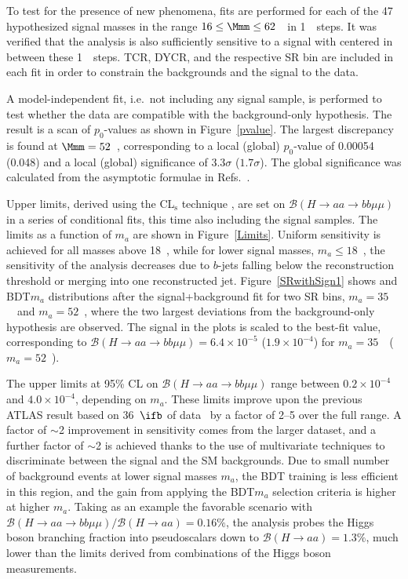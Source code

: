 \documentclass[cernpreprint, backref=false, texlive=2020, UKenglish, dvipsnames, block=none, texmf]{atlasdoc}
\begin{document}
 
To test for the presence of new phenomena, fits are performed for each of the 47 hypothesized signal masses in the range $16\leq\Mmm\leq62$~\GeV\ in 1~\GeV\ steps.
It was verified that the analysis is also sufficiently sensitive to a signal with \Mmm centered in between these 1~\GeV\ steps.
TCR, DYCR, and the respective SR bin are included in each fit in order to constrain  the backgrounds and the signal to the data.
 
 
A model-independent fit, i.e.\ not including any signal sample, is performed to test whether the data are compatible with the background-only hypothesis. The result  is a scan of $p_0$-values as shown in Figure~\ref{pvalue}. The largest discrepancy is found at $\Mmm=52$~\GeV, corresponding to a local (global) $p_0$-value of 0.00054 (0.048) and a local (global) significance of $3.3 \sigma$ ($1.7 \sigma$). The global significance was calculated from the asymptotic formulae in Refs.~\cite{Cowan:2010js,Gross_2010}.
 
 
Upper limits, derived using  the CL$_\text{s}$ technique \cite{Read:2002hq,Junk:1999kv}, are set on $\mathcal{B}(H \rightarrow aa \rightarrow bb\mu\mu)$ in a series of conditional fits, this time also including the signal samples.
The limits as a function of $m_a$ are shown in Figure~\ref{Limits}.
Uniform sensitivity is achieved for all masses above 18~\GeV, while for lower signal masses, $m_a \leq 18$~\GeV, the sensitivity of the analysis decreases due to $b$-jets falling below the reconstruction threshold or merging into one reconstructed jet.
Figure~\ref{SRwithSign1} shows \Mmm and BDT$m_a$ distributions  after the signal+background fit for two SR bins, $m_a=35$~\GeV\ and $m_a=52$~\GeV, where the two largest deviations from the background-only hypothesis are observed.
The signal in the plots is scaled to the best-fit value, corresponding to $\mathcal{B}(H \rightarrow aa \rightarrow bb\mu\mu)=6.4\times 10^{-5}$ ($1.9\times 10^{-4}$) for $m_a=35$~\GeV\ ($m_a=52$~\GeV).
 
The upper limits at 95\% CL on $\mathcal{B}(H\rightarrow aa\rightarrow bb\mu\mu)$ range between $0.2 \times 10^{-4}$ and $4.0 \times 10^{-4}$, depending on $m_a$.
These limits improve upon the previous ATLAS result based on 36~$\ifb$ of data~\cite{bbmm36ifb} by a factor of 2--5 over the full  \Mmm range. A factor of $\sim$2 improvement in sensitivity comes from the larger dataset, and a further factor of $\sim$2 is achieved thanks to the use of multivariate techniques to discriminate between the signal and the SM backgrounds. Due to small number of background events at lower signal masses $m_a$, the BDT training is less efficient in this region, and the gain from applying the BDT$m_a$ selection criteria is higher at higher $m_a$.
Taking as an example the favorable scenario with $\mathcal{B}(H\rightarrow aa\rightarrow bb\mu\mu)/ \mathcal{B}(H\rightarrow aa )= 0.16\%$, the analysis probes the Higgs boson branching fraction into pseudoscalars down to $\mathcal{B}(H\rightarrow aa) = 1.3\%$, much lower than the limits derived from combinations of the Higgs boson measurements.
 
\end{document}

